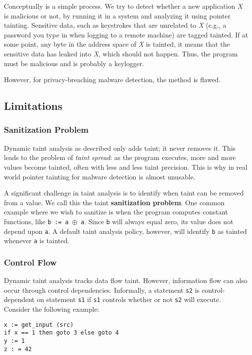 Conceptually is a simple process. We try to detect whether a new application \textit{X} is malicious or not, by running it in a system and analyzing it using pointer tainting. Sensitive data, such as keystrokes that are unrelated to \textit{X} (e.g., a password you type in when logging to a remote machine) are tagged tainted. If at some point, any byte in the address space of \textit{X} is tainted, it means that the sensitive data has leaked into \textit{X}, which should not happen. Thus, the program must be malicious and is probably a keylogger.

However, for privacy-breaching malware detection, the method is flawed.

\subsection{Limitations}
\subsubsection{Sanitization Problem}
Dynamic taint analysis as described only adds taint; it never removes it. This leads to the problem of \textit{taint spread}: as the program executes, more and more values become tainted, often with less and less taint precision. This is why in real world pointer tainting for malware detection is almost unusable.

A significant challenge in taint analysis is to identify when taint can be removed from a value. We call this the taint \textbf{sanitization problem}. One common example where we wish to sanitize is when the program computes constant functions, like \texttt{b := a $\oplus$ a}. Since \texttt{b} will always equal zero, its value does not depend upon \texttt{a}. A default taint analysis policy, however, will identify \texttt{b} as tainted whenever \texttt{a} is tainted.

\subsubsection{Control Flow}
Dynamic taint analysis tracks data flow taint. However, information flow can also occur through control dependencies. Informally, a statement \texttt{s2} is control-dependent on statement \texttt{s1} if \texttt{s1} controls whether or not \texttt{s2} will execute. Consider the following example:

\begin{lstlisting}
x := get_input (src)
if x == 1 then goto 3 else goto 4
y := 1
z : = 42
\end{lstlisting}


